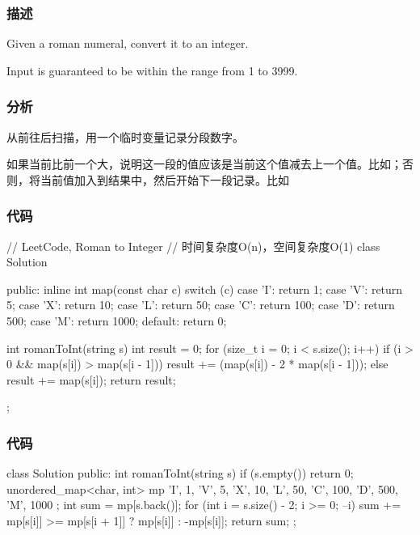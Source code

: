 \subsubsection{描述}
Given a roman numeral, convert it to an integer.

Input is guaranteed to be within the range from 1 to 3999.


\subsubsection{分析}
从前往后扫描，用一个临时变量记录分段数字。

如果当前比前一个大，说明这一段的值应该是当前这个值减去上一个值。比如；否则，将当前值加入到结果中，然后开始下一段记录。比如


\subsubsection{代码}
\begin{Code}
// LeetCode, Roman to Integer
// 时间复杂度O(n)，空间复杂度O(1)
class Solution {
public:
    inline int map(const char c) {
        switch (c) {
        case 'I': return 1;
        case 'V': return 5;
        case 'X': return 10;
        case 'L': return 50;
        case 'C': return 100;
        case 'D': return 500;
        case 'M': return 1000;
        default: return 0;
        }
    }

    int romanToInt(string s) {
        int result = 0;
        for (size_t i = 0; i < s.size(); i++) {
            if (i > 0 && map(s[i]) > map(s[i - 1])) {
                result += (map(s[i]) - 2 * map(s[i - 1]));
            } else {
                result += map(s[i]);
            }
        }
        return result;
    }
};
\end{Code}

\subsubsection{代码}
\begin{Code}
class Solution {
public:
    int romanToInt(string s) {
        if (s.empty()) {
            return 0;
        }
        unordered_map<char, int> mp { {'I', 1}, {'V', 5}, {'X', 10}, {'L', 50}, {'C', 100}, {'D', 500}, {'M', 1000} };
        int sum = mp[s.back()];
        for (int i = s.size() - 2; i >= 0; --i) {
            sum += mp[s[i]] >= mp[s[i + 1]] ? mp[s[i]] : -mp[s[i]];
        }
        return sum;
    }
};
\end{Code}

